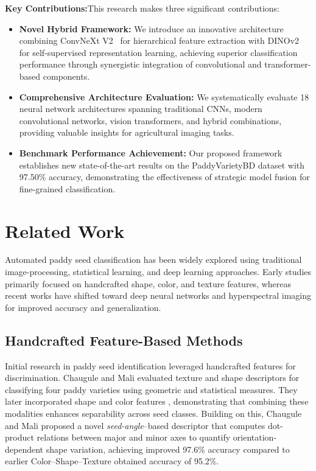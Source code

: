 \documentclass[conference]{IEEEtran}
\begin{document}
\textbf{Key Contributions:}This research makes three significant contributions:

\begin{itemize}
\item \textbf{Novel Hybrid Framework:} We introduce an innovative architecture combining ConvNeXt V2~\cite{convnext} for hierarchical feature extraction with DINOv2~\cite{dinov2} for self-supervised representation learning, achieving superior classification performance through synergistic integration of convolutional and transformer-based components.

\item \textbf{Comprehensive Architecture Evaluation:} We systematically evaluate 18 neural network architectures spanning traditional CNNs, modern convolutional networks, vision transformers, and hybrid combinations, providing valuable insights for agricultural imaging tasks.

\item \textbf{Benchmark Performance Achievement:} Our proposed framework establishes new state-of-the-art results on the PaddyVarietyBD dataset with 97.50\% accuracy, demonstrating the effectiveness of strategic model fusion for fine-grained classification.
\end{itemize}



\section{Related Work}

Automated paddy seed classification has been widely explored using traditional image-processing, statistical learning, and deep learning approaches. Early studies primarily focused on handcrafted shape, color, and texture features, whereas recent works have shifted toward deep neural networks and hyperspectral imaging for improved accuracy and generalization.

\subsection{Handcrafted Feature-Based Methods}

Initial research in paddy seed identification leveraged handcrafted features for discrimination. Chaugule and Mali \cite{https://doi.org/10.1155/2014/617263} evaluated texture and shape descriptors for classifying four paddy varieties using geometric and statistical measures. They later incorporated shape and color features \cite{chaugule2014}, demonstrating that combining these modalities enhances separability across seed classes. Building on this, Chaugule and Mali \cite{CHAUGULE2016415} proposed a novel \emph{seed-angle}–based descriptor that computes dot-product relations between major and minor axes to quantify orientation-dependent shape variation, achieving improved 97.6\% accuracy compared to earlier Color–Shape–Texture obtained accuracy of 95.2\%. 
\end{document}
